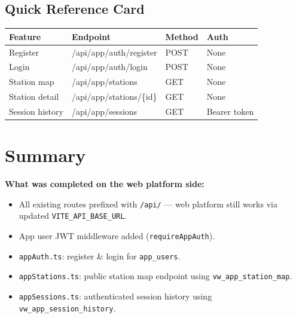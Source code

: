 \documentclass[12pt,a4paper]{report}
\newcommand{\file}[1]{\texttt{\small #1}}
\newcommand{\done}{\textcolor{greenfg}{$\checkmark$}}
\begin{document}
\section{Quick Reference Card}

\begin{center}
\begin{tabularx}{0.95\linewidth}{l >{\ttfamily\small}l l l}
  \toprule
  \rowcolor{tablehead}
  \color{white}\textbf{Feature} &
  \color{white}\textbf{Endpoint} &
  \color{white}\textbf{Method} &
  \color{white}\textbf{Auth} \\
  \midrule
  Register          & /api/app/auth/register    & POST & None \\
  \rowcolor{rowalt}
  Login             & /api/app/auth/login       & POST & None \\
  Station map       & /api/app/stations         & GET  & None \\
  \rowcolor{rowalt}
  Station detail    & /api/app/stations/\{id\}  & GET  & None \\
  Session history   & /api/app/sessions         & GET  & Bearer token \\
  \bottomrule
\end{tabularx}
\end{center}

\chapter{Summary}

\begin{tcolorbox}[colback=greenbg, colframe=greenfg!40, arc=4pt]
\textbf{What was completed on the web platform side:}
\begin{itemize}
  \item[\done] All existing routes prefixed with \texttt{/api/} — web platform still works via updated \texttt{VITE\_API\_BASE\_URL}.
  \item[\done] App user JWT middleware added (\texttt{requireAppAuth}).
  \item[\done] \file{appAuth.ts}: register \& login for \texttt{app\_users}.
  \item[\done] \file{appStations.ts}: public station map endpoint using \texttt{vw\_app\_station\_map}.
  \item[\done] \file{appSessions.ts}: authenticated session history using \texttt{vw\_app\_session\_history}.
\end{itemize}
\end{tcolorbox}
\end{document}
